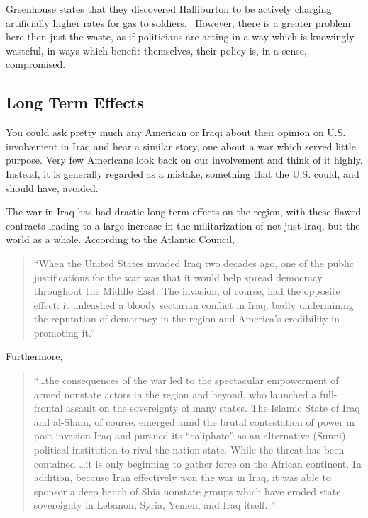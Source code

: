 \documentclass[12pt]{article}
\begin{document}
        Greenhouse states that they discovered Halliburton to be actively charging artificially higher rates for gas to soldiers.~\parencite{nytimes2005halliburtoncontract} However, there is a greater problem here then just the waste, as if politicians are acting in a way which is knowingly wasteful, in ways which benefit themselves, their policy is, in a sense, compromised. 

        
     \subsection{Long Term Effects}   
        You could ask pretty much any American or Iraqi about their opinion on U.S. involvement in Iraq and hear a similar story, one about a war which served little purpose. Very few Americans look back on our involvement and think of it highly. Instead, it is generally regarded as a mistake, something that the U.S. could, and should have, avoided. \parencite{igielnik2019wars}

        The war in Iraq has had drastic long term effects on the region, with these flawed contracts leading to a large increase in the militarization of not just Iraq, but the world as a whole. According to the Atlantic Council,

        \begin{quotation}
            ``When the United States invaded Iraq two decades ago, one of the public justifications for the war was that it would help spread democracy throughout the Middle East. The invasion, of course, had the opposite effect: it unleashed a bloody sectarian conflict in Iraq, badly undermining the reputation of democracy in the region and America's credibility in promoting it.'' \parencite{atlanticcouncil_iraqwar2023}
        \end{quotation}

        Furthermore, 

        \begin{quotation}
            ``\ldots the consequences of the war led to the spectacular empowerment of armed nonstate actors in the region and beyond, who launched a full-frontal assault on the sovereignty of many states. The Islamic State of Iraq and al-Sham, of course, emerged amid the brutal contestation of power in post-invasion Iraq and pursued its “caliphate” as an alternative (Sunni) political institution to rival the nation-state. While the threat has been contained \ldots it is only beginning to gather force on the African continent. In addition, because Iran effectively won the war in Iraq, it was able to sponsor a deep bench of Shia nonstate groups which have eroded state sovereignty in Lebanon, Syria, Yemen, and Iraq itself. '' \parencite{atlanticcouncil_iraqwar2023}
        \end{quotation}
\end{document}
